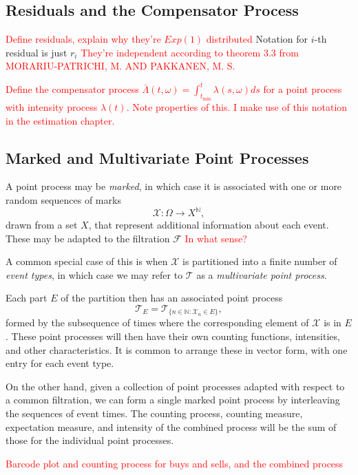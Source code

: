 \documentclass[honours,12pt]{unswthesis}
\numberwithin{equation}{section}
\begin{document}
\subsection{Residuals and the Compensator Process}
\textcolor{red}{Define residuals, explain why they're $Exp(1)$ distributed}
Notation for $i$-th residual is just $r_i$
\textcolor{red}{They're independent according to theorem 3.3 from MORARIU-PATRICHI, M. AND PAKKANEN, M. S.}

\textcolor{red}{Define the compensator process $\bar\Lambda(t,\omega)=\int_{t_\mathrm{min}}^t \lambda(s,\omega)ds$ for a point process with intensity process $\lambda(t)$. Note properties of this. I make use of this notation in the estimation chapter.}

\subsection{Marked and Multivariate Point Processes}

A point process  may be \textit{marked}, in which case it is associated with one or more random sequences of marks $$\mathcal{X}:\Omega\to X^\mathbb{N},$$
drawn from a set $X$, that represent additional information about each event. These may be adapted to the filtration $\mathcal{F}$ \textcolor{red}{In what sense?}

A common special case of this is when $\mathcal{X}$ is partitioned into a finite number of \textit{event types}, in which case we may refer to $\mathcal{T}$ as a \textit{multivariate point process}.

Each part $E$ of the partition then has an associated point process $$\mathcal{T}_E = \mathcal{T}_{\{n\in\mathbb{N} : \mathcal{X}_n\in E\}},$$ formed by the subsequence of times where the corresponding element of $\mathcal{X}$ is in $E$. These point processes will then have their own counting functions, intensities, and other characteristics. It is common to arrange these in vector form, with one entry for each event type.

On the other hand, given a collection of point processes adapted with respect to a common filtration, we can form a single marked point process by interleaving the sequences of event times. The counting process, counting measure, expectation measure, and intensity of the combined process will be the sum of those for the individual point processes.

\textcolor{red}{Barcode plot and counting process for buys and sells, and the combined process}
\end{document}
